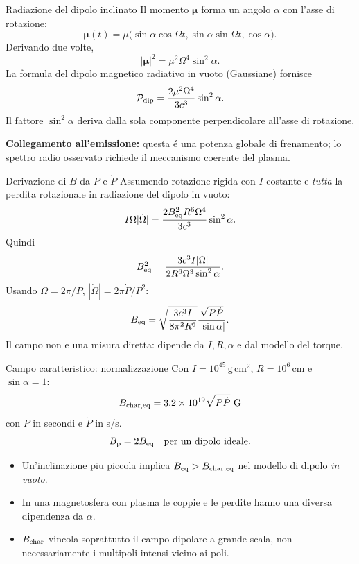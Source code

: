 \begin{frame}[t]{Radiazione del dipolo inclinato}
\small
Il momento $\boldsymbol\mu$ forma un angolo $\alpha$ con l'asse di rotazione:
\[
\boldsymbol\mu(t)=\mu
\bigl(\sin\alpha\cos\Omega t,\sin\alpha\sin\Omega t,\cos\alpha\bigr).
\]
Derivando due volte,
\[
|\ddot{\boldsymbol\mu}|^2=\mu^2\Omega^4\sin^2\alpha.
\]
La formula del dipolo magnetico radiativo in vuoto (Gaussiane) fornisce
\[
\mathcal P_{\rm dip}=\frac{2\mu^2\Omega^4}{3c^3}\sin^2\alpha.
\]
Il fattore $\sin^2\alpha$ deriva dalla sola componente perpendicolare all'asse di rotazione.
\par\smallskip
\textbf{Collegamento all'emissione:} questa \'e una potenza globale di frenamento;
lo spettro radio osservato richiede il meccanismo coerente del plasma.
\end{frame}

\begin{frame}[t]{Derivazione di $B$ da $P$ e $\dot P$}
\small
Assumendo rotazione rigida con $I$ costante e \emph{tutta} la perdita rotazionale in radiazione del dipolo in vuoto:
\[
I\Omega|\dot\Omega|=\frac{2B_{\rm eq}^2R^6\Omega^4}{3c^3}\sin^2\alpha.
\]
Quindi
\[
B_{\rm eq}^2=\frac{3c^3I|\dot\Omega|}{2R^6\Omega^3\sin^2\alpha}.
\]
Usando $\Omega=2\pi/P$, $|\dot\Omega|=2\pi\dot P/P^2$:
\[
B_{\rm eq}=\sqrt{\frac{3c^3I}{8\pi^2R^6}}
\frac{\sqrt{P\dot P}}{|\sin\alpha|}.
\]
Il campo non e una misura diretta: dipende da $I,R,\alpha$ e dal modello del torque.
\end{frame}

\begin{frame}[t]{Campo caratteristico: normalizzazione}
\small
Con $I=10^{45}\,\mathrm{g\,cm^2}$, $R=10^6\,$cm e $\sin\alpha=1$:
\[
B_{\rm char,eq}=3.2\times10^{19}\sqrt{P\dot P}\ \mathrm G
\]
con $P$ in secondi e $\dot P$ in s/s.
\[
B_{\rm p}=2B_{\rm eq}\quad\text{per un dipolo ideale}.
\]
\begin{itemize}
\item Un'inclinazione piu piccola implica $B_{\rm eq}>B_{\rm char,eq}$ nel modello di dipolo \emph{in vuoto}.
\item In una magnetosfera con plasma le coppie e le perdite hanno una diversa dipendenza da $\alpha$.
\item $B_{\rm char}$ vincola soprattutto il campo dipolare a grande scala, non necessariamente i multipoli intensi vicino ai poli.
\end{itemize}
\end{frame}

